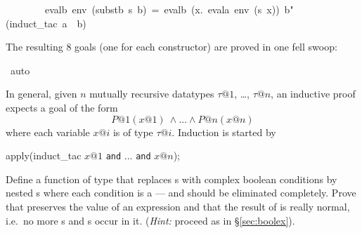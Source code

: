 \begin{isabelle}
~~~~~~~~evalb~env~(substb~s~b)~=~evalb~({\isasymlambda}x.~evala~env~(s~x))~b{"}\isanewline
{}(induct\_tac~a~~b)%
\begin{isamarkuptxt}%
\noindent
The resulting 8 goals (one for each constructor) are proved in one fell swoop:%
\end{isamarkuptxt}%
~auto%
\begin{isamarkuptext}%
In general, given $n$ mutually recursive datatypes $\tau@1$, \dots, $\tau@n$,
an inductive proof expects a goal of the form
\[ P@1(x@1)\ \land \dots \land P@n(x@n) \]
where each variable $x@i$ is of type $\tau@i$. Induction is started by
\begin{ttbox}
apply(induct_tac \(x@1\) \texttt{and} \(\dots\) \texttt{and} \(x@n\));
\end{ttbox}

\begin{exercise}
  Define a function  of type  that
  replaces s with complex boolean conditions by nested
  s where each condition is a  ---  and
   should be eliminated completely. Prove that 
  preserves the value of an expression and that the result of 
  is really normal, i.e.\ no more s and s occur in
  it.  ({\em Hint:} proceed as in \S\ref{sec:boolex}).
\end{exercise}%
\end{isamarkuptext}%
\end{isabelle}%
